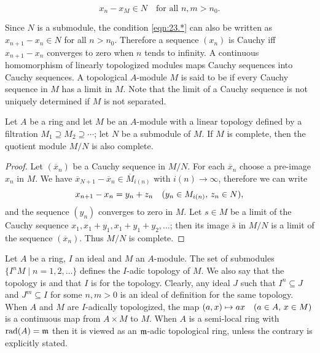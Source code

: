 \documentclass[../main]{subfiles}
\begin{document}
\begin{equation}
\tag{23.*}\label{eqn:23.*}
x_n - x_M \in N \quad \text {for all } n, m > n_0.
\end{equation}

Since $N$ is a submodule, the condition \ref{eqn:23.*} can also be written as\newline $x_{n + 1} - x_n \in N$ for all $n > n_0$. Therefore a sequence $(x_n)$ is Cauchy iff $x_{n + 1} - x_n$ converges to zero when $n$ tends to infinity. A continuous homomorphism of linearly topologized modules maps Cauchy sequences into Cauchy sequences. A topological $A$-module $M$ is said to be  if every Cauchy sequence in $M$ has a limit in $M$. Note that the limit of a Cauchy sequence is not uniquely determined if $M$ is not separated.

\begin{parproposition}
Let $A$ be a ring and let $M$ be an $A$-module with a linear topology defined by a filtration $M_1 \supseteq M_2 \supseteq \cdots$; let $N$ be a submodule of $M$. If $M$ is complete, then the quotient module $M/N$ is also complete.
\end{parproposition}

\begin{proof}
Let $(\overline x_n)$ be a Cauchy sequence in $M/N$. For each $\overline x_n$ choose a pre-image $x_n$ in $M$. We have $\overline x_{N + 1} - \overline x_n \in \overline M_{i(n)}$ with $i(n) \to \infty$, therefore we can write
\[
x_{n + 1} - x_n = y_n + z_n \for{y_n \in M_{i(n)},\, z_n \in N},
\]
and the sequence $(y_n)$ converges to zero in $M$. Let $s \in M$ be a limit of the Cauchy sequence $x_1, x_1 + y_1, x_1 + y_1 + y_2,\ldots$; then its image $\overline s$ in $M/N$ is a limit of the sequence $(\overline x_n)$. Thus $M/N$ is complete.
\end{proof}

\newparagraph Let $A$ be a ring, $I$ an ideal and $M$ an $A$-module. The set of submodules $\{I^n M \mid n = 1, 2, \ldots\}$ defines the $I$-adic topology of $M$. We also say that the topology is  and that $I$ is  for the topology. Clearly, any ideal $J$ such that $I^n \subseteq J$ and $J^m \subseteq I$ for some $n, m > 0$ is an ideal of definition for the same topology. When $A$ and $M$ are $I$-adically topologized, the map $(a, x) \mapsto a x\for{a \in A,\,x \in M}$ is a continuous map from $A \times M$ to $M$. When $A$ is a semi-local ring with $\operatorname{rad}(A) = \mathfrak{m}$ then it is viewed as an $\mathfrak{m}$-adic topological ring, unless the contrary is explicitly stated.
\end{document}
